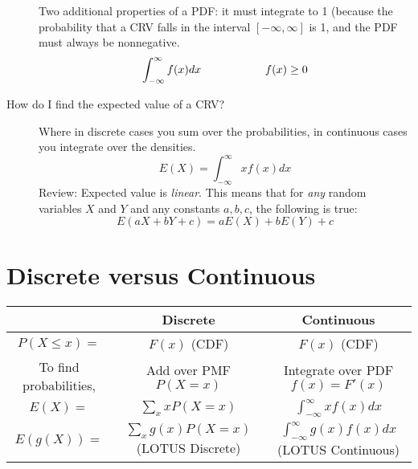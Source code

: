 \documentclass[11.5pt]{article}
\begin{document}
\begin{notes}
\begin{description}
Two additional properties of a PDF:  it must integrate to 1 (because the probability that a CRV falls in the interval $[-\infty, \infty]$ is 1, and the PDF must always be nonnegative.
\[\int^\infty_{-\infty}f(x)dx \hspace{2 cm} f(x) \geq 0\]
\item[How do I find the expected value of a CRV?] Where in discrete cases you sum over the probabilities, in continuous cases you integrate over the densities.
\[E(X) = \int^\infty_{-\infty}xf(x)dx \]
Review: Expected value is \emph{linear}. This means that for \emph{any} random variables $X$ and $Y$ and any constants $a, b, c$, the following is true:
\[E(aX + bY + c) = aE(X) + bE(Y) + c\]
\end{description}

\section*{Discrete versus Continuous}
\begin{table}[htb!] \begin{center}
	\begin{tabular}{ccc}
	\toprule
		~ & \textbf{Discrete} & \textbf{Continuous} \\ \midrule
		$P(X \leq x) = $  & $F(x)$ (CDF) & $F(x)$ (CDF) \\ 
		To find probabilities, & Add over PMF $P(X = x)$ & Integrate over PDF $f(x) = F'(x)$ \\ 
		$E(X) =$ & $\sum_x xP(X=x)$ & $\int_{-\infty}^{\infty}xf(x)dx$ \\ 
		$E(g(X)) =$ & $\sum_x g(x)P(X=x)$ (LOTUS Discrete) & $\int_{-\infty}^{\infty} g(x)f(x)dx$ (LOTUS Continuous)
	\end{tabular}\end{center}
\end{table}






\end{notes}
\end{document}
